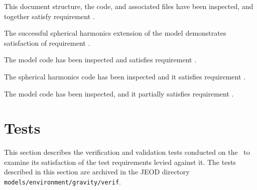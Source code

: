 \label{inspect:TLI}
This document structure, the code, and associated files have been inspected,
and together satisfy requirement .

\label{inspect:extensible}
The successful spherical harmonics extension of the model demonstrates
satisfaction of requirement .

\label{inspect:generic_data}
The model code has been inspected and satisfies requirement
.

\label{inspect:spherharm_data}
The spherical harmonics code has been inspected and it satisfies requirement
.

\label{inspect:generic_func}
The model code has been inspected, and it partially satisfies requirement
.

\section{Tests}
This section describes the verification and validation tests conducted on
the \ModelDesc\ to examine its satisfaction of the test requirements levied
against it. The tests described in this section are archived in the JEOD
directory \verb+models/environment/gravity/verif+. 

